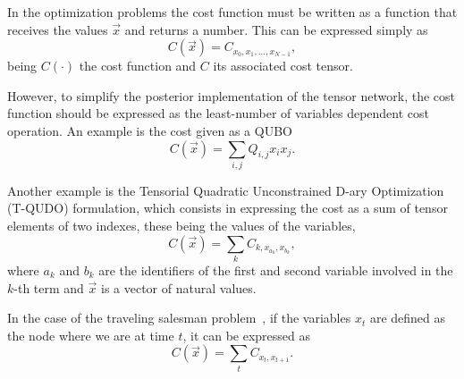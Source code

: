 In the optimization problems the cost function must be written as a function that receives the values $\vec{x}$ and returns a number. This can be expressed simply as
\begin{equation}
    C(\vec{x}) = C_{x_0,x_1,\dots,x_{N-1}},
\end{equation}
being $C(\cdot)$ the cost function and $C$ its associated cost tensor.

However, to simplify the posterior implementation of the tensor network, the cost function should be expressed as the least-number of variables dependent cost operation. An example is the cost given as a QUBO
\begin{equation}\label{eq: QUBO}
    C(\vec{x}) = \sum_{i,j}Q_{i,j}x_i x_j.
\end{equation}

Another example is the Tensorial Quadratic Unconstrained D-ary Optimization (T-QUDO) formulation, which consists in expressing the cost as a sum of tensor elements of two indexes, these being the values of the variables,
\begin{equation}\label{eq: T QUDO cost}
    C(\vec{x}) = \sum_{k} C_{k,x_{a_k},x_{b_k}},
\end{equation}
where $a_k$ and $b_k$ are the identifiers of the first and second variable involved in the $k$-th term and $\vec{x}$ is a vector of natural values.

In the case of the traveling salesman problem~\cite{TSP_General}, if the variables $x_t$ are defined as the node where we are at time $t$, it can be expressed as
\begin{equation}
    C(\vec{x}) = \sum_{t} C_{x_t,x_{t+1}}.
\end{equation}

